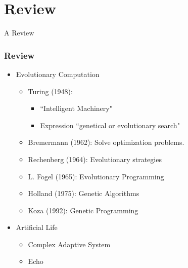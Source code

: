 \section{Review}

\frame
{
	\begin{center}
		\LARGE A Review
	\end{center}
}

\frame
{
	\frametitle{Review}
	
	\begin{itemize}
		\item Evolutionary Computation
			\begin{itemize}
				\item Turing (1948):
					\begin{itemize}
						\item ``Intelligent Machinery"
						\item Expression ``genetical or evolutionary search"
					\end{itemize}
				\item Bremermann (1962): Solve optimization problems.
				\item Rechenberg (1964): Evolutionary strategies
				\item L. Fogel (1965): Evolutionary Programming
				\item Holland (1975): Genetic Algorithms
				\item Koza (1992): Genetic Programming				
			\end{itemize}
		\item Artificial Life
			\begin{itemize}
				\item Complex Adaptive System
				\item Echo
			\end{itemize}
	\end{itemize}
}

